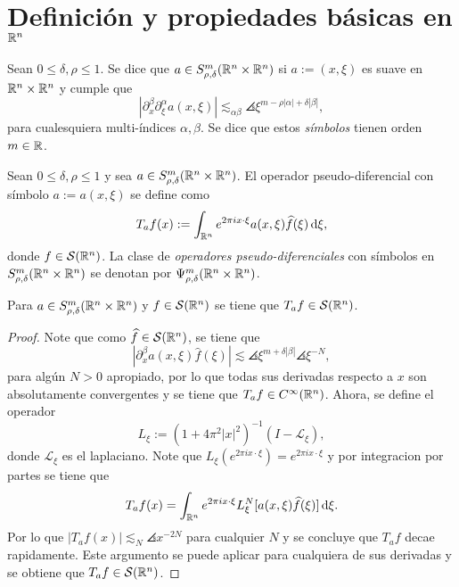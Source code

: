 \section{Definición y propiedades básicas en $\mathbb{R}^n$}
\begin{definition}
	Sean $0\leq\delta,\rho\leq1$. Se dice que $a \in S^m_{\rho,\delta}(\mathbb{R}^n\times\mathbb{R}^n)$ si $a:=(x,\xi)$ es suave en $\mathbb{R}^n\times\mathbb{R}^n$ y cumple que
	\begin{equation*}
		|\partial^\beta_x\partial^\alpha_\xi a(x, \xi)| \lesssim_{\alpha\beta}\angles{\xi}^{m-\rho|\alpha|+\delta|\beta|},
	\end{equation*}
	para cualesquiera multi-índices $\alpha,\beta$. Se dice que estos \textit{símbolos} tienen orden $m\in\mathbb{R}$.
\end{definition}
\begin{definition}
	Sean $0\leq\delta,\rho\leq1$ y sea $a \in S^m_{\rho,\delta}(\mathbb{R}^n\times\mathbb{R}^n)$. El operador pseudo-diferencial con símbolo $a:=a(x,\xi)$ se define como
	\begin{equation*}
		T_af(x):= \int_{\mathbb{R}^n} e^{2\pi ix\cdot\xi} a(x, \xi)\widehat{f}(\xi)\mathop{}\!\mathrm{d} \xi,
	\end{equation*}
	donde $f\in\mathcal{S}(\mathbb{R}^n)$. La clase de \textit{operadores pseudo-diferenciales} con símbolos en $S^m_{\rho,\delta}(\mathbb{R}^n\times\mathbb{R}^n)$ se denotan por $\Psi^m_{\rho,\delta}(\mathbb{R}^n\times\mathbb{R}^n)$.
\end{definition}
\begin{proposition}
	Para $a \in S^m_{\rho,\delta}(\mathbb{R}^n\times\mathbb{R}^n)$ y $f\in\mathcal{S}(\mathbb{R}^n)$ se tiene que $T_af\in\mathcal{S}(\mathbb{R}^n)$.
\end{proposition}
\begin{proof}
	Note que como $\widehat{f}\in\mathcal{S}(\mathbb{R}^n)$, se tiene que 
	\[|\partial^\beta_xa(x, \xi)\widehat{f}(\xi)|\lesssim \angles{\xi}^{m+\delta|\beta|}\angles{\xi}^{-N} ,\]
	para algún $N>0$ apropiado, por lo que todas sus derivadas respecto a $x$ son absolutamente convergentes y se tiene que $T_af\in C^\infty(\mathbb{R}^n)$. Ahora, se define el operador 
	\begin{equation*}
		L_\xi := (1 + 4\pi^2|x|^2)^{-1}(I-\mathcal{L}_\xi),
	\end{equation*}
	donde $\mathcal{L}_\xi$ es el laplaciano. Note que $ L_\xi(e^{2\pi ix\cdot\xi}) = e^{2\pi ix\cdot \xi} $ y por integracion por partes se tiene que
	\begin{equation*}
		T_af(x) = \int_{\mathbb{R}^n} e^{2\pi ix\cdot \xi}L_\xi^N [a(x,\xi)\widehat{f}(\xi)] \mathop{}\!\mathrm{d} \xi.
	\end{equation*}
	Por lo que $|T_af(x)| \lesssim_N \angles{x}^{-2N}$ para cualquier $N$ y se concluye que $T_af$ decae rapidamente. Este argumento se puede aplicar para cualquiera de sus derivadas y se obtiene que $T_af\in\mathcal{S}(\mathbb{R}^n)$.
\end{proof}
